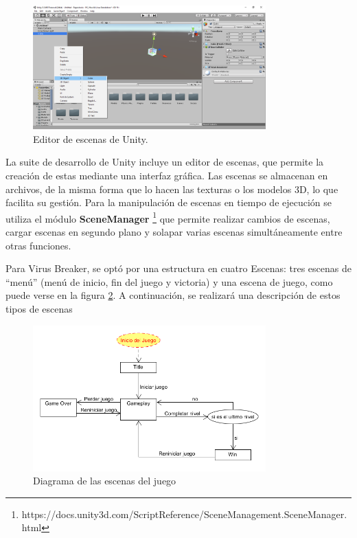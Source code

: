 \begin{figure}[h]
    \centering
    \includegraphics[width=0.8\textwidth]{images/estructura/old/escenas/editor}
    \caption{Editor de escenas de Unity.}
    \label{scene_editor}
\end{figure}

La suite de desarrollo de Unity incluye un editor de escenas, que permite la creación de estas mediante una interfaz gráfica. Las escenas se almacenan en archivos, de la misma forma que lo hacen las texturas o los modelos 3D, lo que facilita su gestión. Para la manipulación de escenas en tiempo de ejecución se utiliza el módulo \textbf{SceneManager} \footnote{https://docs.unity3d.com/ScriptReference/SceneManagement.SceneManager.html} que permite realizar cambios de escenas, cargar escenas en segundo plano y solapar varias escenas simultáneamente entre otras funciones. 

Para Virus Breaker, se optó por una estructura en cuatro Escenas: tres escenas de ``menú'' (menú de inicio, fin del juego y victoria) y una escena de juego, como puede verse en la figura \ref{scenes}. A continuación, se realizará una descripción de estos tipos de escenas

\begin{figure}[h]
	\includegraphics[width=0.8\textwidth]{images/estructura/old/escenas/scenes}
	\centering
	\caption{Diagrama de las escenas del juego}
	\label{scenes}
\end{figure}

